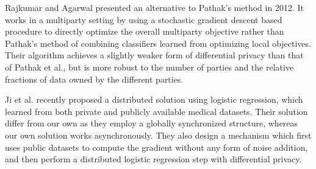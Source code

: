 Rajkumar and Agarwal \citep{rajkumar2012differentially} presented an alternative to Pathak's method in 2012. It works in a multiparty setting by using a stochastic gradient descent based procedure to directly optimize the overall multiparty objective rather than Pathak's method of combining classifiers learned from optimizing local objectives. Their algorithm achieves a slightly weaker form of differential privacy than that of Pathak et al., but is more robust to the number of parties and the relative fractions of data owned by the different parties.

Ji et al. \citep{ji2014DisLogReg} recently proposed a distributed solution using logistic regression, which learned from both private and publicly available medical datasets. Their solution differ from our own as they employ a globally synchronized structure, whereas our own solution works asynchronously. They also design a mechanism which first uses public datasets to compute the gradient without any form of noise addition, and then perform a distributed logistic regression step with differential privacy. 


